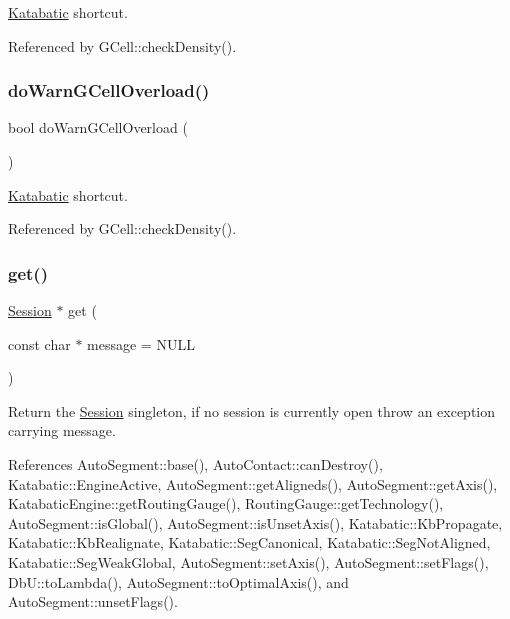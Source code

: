 \hyperlink{namespaceKatabatic}{Katabatic} shortcut. 

Referenced by G\+Cell\+::check\+Density().

\mbox{\label{classKatabatic_1_1Session_ad41e6fb02bd7bb01c27fb6aae36f0ddc}} 
\subsubsection{\texorpdfstring{do\+Warn\+G\+Cell\+Overload()}{doWarnGCellOverload()}}
{\footnotesize\ttfamily bool do\+Warn\+G\+Cell\+Overload (\begin{DoxyParamCaption}{ }\end{DoxyParamCaption})\hspace{0.3cm}{\ttfamily [static]}}

\hyperlink{namespaceKatabatic}{Katabatic} shortcut. 

Referenced by G\+Cell\+::check\+Density().

\mbox{\label{classKatabatic_1_1Session_a76f17c3642eaeba85fa0af5ae9d208b4}} 
\subsubsection{\texorpdfstring{get()}{get()}}
{\footnotesize\ttfamily \hyperlink{classKatabatic_1_1Session}{Session} $\ast$ get (\begin{DoxyParamCaption}\item[{const char $\ast$}]{message = {\ttfamily NULL} }\end{DoxyParamCaption})\hspace{0.3cm}{\ttfamily [static]}}

Return the \hyperlink{classKatabatic_1_1Session}{Session} singleton, if no session is currently open throw an exception carrying {\ttfamily message}. 

References Auto\+Segment\+::base(), Auto\+Contact\+::can\+Destroy(), Katabatic\+::\+Engine\+Active, Auto\+Segment\+::get\+Aligneds(), Auto\+Segment\+::get\+Axis(), Katabatic\+Engine\+::get\+Routing\+Gauge(), Routing\+Gauge\+::get\+Technology(), Auto\+Segment\+::is\+Global(), Auto\+Segment\+::is\+Unset\+Axis(), Katabatic\+::\+Kb\+Propagate, Katabatic\+::\+Kb\+Realignate, Katabatic\+::\+Seg\+Canonical, Katabatic\+::\+Seg\+Not\+Aligned, Katabatic\+::\+Seg\+Weak\+Global, Auto\+Segment\+::set\+Axis(), Auto\+Segment\+::set\+Flags(), Db\+U\+::to\+Lambda(), Auto\+Segment\+::to\+Optimal\+Axis(), and Auto\+Segment\+::unset\+Flags().

